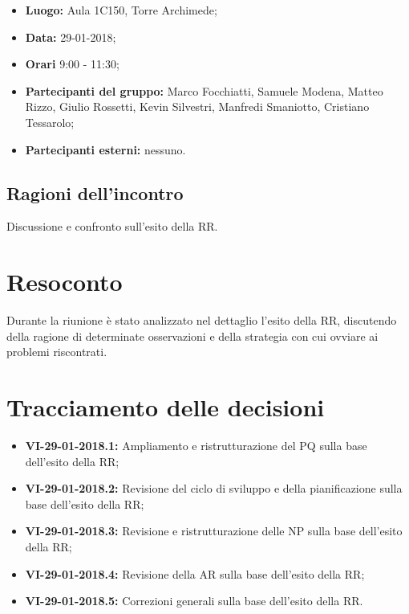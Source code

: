 \documentclass[openany,12pt,a4paper]{article}
\begin{document}
	\begin{itemize} 
	    \item \textbf{Luogo:} Aula 1C150, Torre Archimede;
	    \item \textbf{Data:} 29-01-2018;
	    \item \textbf{Orari} 9:00 - 11:30;
	    \item \textbf{Partecipanti del gruppo:} Marco Focchiatti, Samuele Modena, Matteo Rizzo, Giulio Rossetti, Kevin Silvestri, Manfredi Smaniotto, Cristiano Tessarolo;
	    \item \textbf{Partecipanti esterni:} nessuno.
	\end{itemize}
	
	\subsection{Ragioni dell'incontro}
	
	Discussione e confronto sull'esito della RR.

	\section{Resoconto}
	
	Durante la riunione è stato analizzato nel dettaglio l'esito della RR, discutendo della ragione di determinate osservazioni e della strategia con cui ovviare ai problemi riscontrati.  
	
	\section{Tracciamento delle decisioni}
	
	\begin{itemize}
	    \item \textbf{VI-29-01-2018.1:} Ampliamento e ristrutturazione del PQ sulla base dell'esito della RR;
	    \item \textbf{VI-29-01-2018.2:} Revisione del ciclo di sviluppo e della pianificazione sulla base dell'esito della RR;
	    \item \textbf{VI-29-01-2018.3:} Revisione e ristrutturazione delle NP sulla base dell'esito della RR;
	    \item \textbf{VI-29-01-2018.4:} Revisione della AR sulla base dell'esito della RR;
	    \item \textbf{VI-29-01-2018.5:} Correzioni generali sulla base dell'esito della RR.
	\end{itemize}	

	
\end{document}
